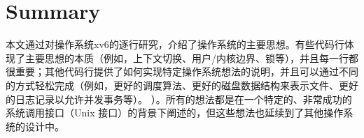 \documentclass[UTF8]{article}
\begin{document}
   \chapter{Summary}   
    \label{CH:SUM}     

本文通过对操作系统xv6的逐行研究，介绍了操作系统的主要思想。有些代码行体现了主要思想的本质（例如，上下文切换、用户/内核边界、锁等），并且每一行都很重要；其他代码行提供了如何实现特定操作系统想法的说明，并且可以通过不同的方式轻松完成（例如，更好的调度算法、更好的磁盘数据结构来表示文件、更好的日志记录以允许并发事务等）。 ）。所有的想法都是在一个特定的、非常成功的系统调用接口（Unix 接口）的背景下阐述的，但这些想法也延续到了其他操作系统的设计中。  


  
\end{document}
